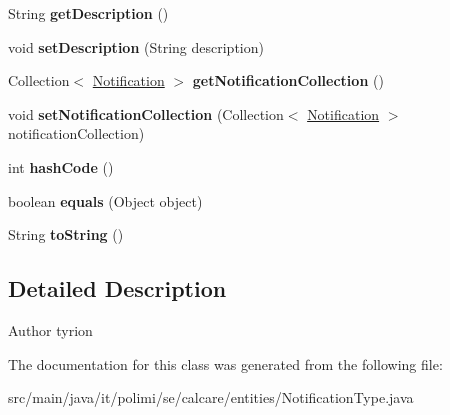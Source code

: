 \begin{DoxyCompactItemize}
\item 
\hypertarget{classit_1_1polimi_1_1se_1_1calcare_1_1entities_1_1NotificationType_a3f729343d563bab3dbaf5cef06d31f82}{}String {\bfseries get\+Description} ()\label{classit_1_1polimi_1_1se_1_1calcare_1_1entities_1_1NotificationType_a3f729343d563bab3dbaf5cef06d31f82}

\item 
\hypertarget{classit_1_1polimi_1_1se_1_1calcare_1_1entities_1_1NotificationType_a96b9cf4f31dc54298543445031a9f974}{}void {\bfseries set\+Description} (String description)\label{classit_1_1polimi_1_1se_1_1calcare_1_1entities_1_1NotificationType_a96b9cf4f31dc54298543445031a9f974}

\item 
\hypertarget{classit_1_1polimi_1_1se_1_1calcare_1_1entities_1_1NotificationType_a34f6fa9d4f8f728a0bf69f806463a4b4}{}Collection$<$ \hyperlink{classit_1_1polimi_1_1se_1_1calcare_1_1entities_1_1Notification}{Notification} $>$ {\bfseries get\+Notification\+Collection} ()\label{classit_1_1polimi_1_1se_1_1calcare_1_1entities_1_1NotificationType_a34f6fa9d4f8f728a0bf69f806463a4b4}

\item 
\hypertarget{classit_1_1polimi_1_1se_1_1calcare_1_1entities_1_1NotificationType_a2642f5dda02b3bcc0e409fe1a838cd7b}{}void {\bfseries set\+Notification\+Collection} (Collection$<$ \hyperlink{classit_1_1polimi_1_1se_1_1calcare_1_1entities_1_1Notification}{Notification} $>$ notification\+Collection)\label{classit_1_1polimi_1_1se_1_1calcare_1_1entities_1_1NotificationType_a2642f5dda02b3bcc0e409fe1a838cd7b}

\item 
\hypertarget{classit_1_1polimi_1_1se_1_1calcare_1_1entities_1_1NotificationType_a3206f3cbc6bd16950d89f031a9f64ea7}{}int {\bfseries hash\+Code} ()\label{classit_1_1polimi_1_1se_1_1calcare_1_1entities_1_1NotificationType_a3206f3cbc6bd16950d89f031a9f64ea7}

\item 
\hypertarget{classit_1_1polimi_1_1se_1_1calcare_1_1entities_1_1NotificationType_a9eadd688e32a63c7d2aae143d66ade92}{}boolean {\bfseries equals} (Object object)\label{classit_1_1polimi_1_1se_1_1calcare_1_1entities_1_1NotificationType_a9eadd688e32a63c7d2aae143d66ade92}

\item 
\hypertarget{classit_1_1polimi_1_1se_1_1calcare_1_1entities_1_1NotificationType_a4fe08a6ab31b6c22e165cc162f77ec70}{}String {\bfseries to\+String} ()\label{classit_1_1polimi_1_1se_1_1calcare_1_1entities_1_1NotificationType_a4fe08a6ab31b6c22e165cc162f77ec70}

\end{DoxyCompactItemize}


\subsection{Detailed Description}
\begin{DoxyAuthor}{Author}
tyrion 
\end{DoxyAuthor}


The documentation for this class was generated from the following file\+:\begin{DoxyCompactItemize}
\item 
src/main/java/it/polimi/se/calcare/entities/Notification\+Type.\+java\end{DoxyCompactItemize}
